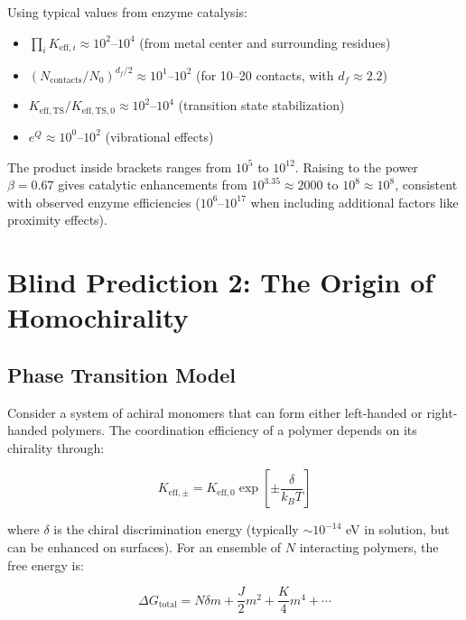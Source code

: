 \documentclass[12pt,a4paper]{article}
\theoremstyle{remark}
\newcommand{\df}{d_{\!f}}
\begin{document}
	Using typical values from enzyme catalysis:
	\begin{itemize}
		\item $\prod_i K_{\mathrm{eff},i} \approx 10^2$--$10^4$ (from metal center and surrounding residues)
		\item $(N_{\text{contacts}}/N_0)^{\df/2} \approx 10^1$--$10^2$ (for 10--20 contacts, with $\df \approx 2.2$)
		\item $K_{\mathrm{eff},\text{TS}}/K_{\mathrm{eff},\text{TS},0} \approx 10^2$--$10^4$ (transition state stabilization)
		\item $e^{Q} \approx 10^0$--$10^2$ (vibrational effects)
	\end{itemize}
	
	The product inside brackets ranges from $10^5$ to $10^{12}$. Raising to the power $\beta = 0.67$ gives catalytic enhancements from $10^{3.35} \approx 2000$ to $10^{8} \approx 10^8$, consistent with observed enzyme efficiencies ($10^6$--$10^{17}$ when including additional factors like proximity effects).
	
	\section{Blind Prediction 2: The Origin of Homochirality}
	\label{sec:chirality}
	
	\subsection{Phase Transition Model}
	
	Consider a system of achiral monomers that can form either left-handed or right-handed polymers. The coordination efficiency of a polymer depends on its chirality through:
	
	\begin{equation}
		K_{\mathrm{eff},\pm} = K_{\mathrm{eff},0} \exp\left[\pm \frac{\delta}{k_B T}\right]
		\label{eq:keff-chiral}
	\end{equation}
	
	where $\delta$ is the chiral discrimination energy (typically $\sim 10^{-14}$ eV in solution, but can be enhanced on surfaces). For an ensemble of $N$ interacting polymers, the free energy is:
	
	\begin{equation}
		\Delta G_{\text{total}} = N \delta m + \frac{J}{2} m^2 + \frac{K}{4} m^4 + \cdots
		\label{eq:chiral-free}
	\end{equation}
	
\end{document}
